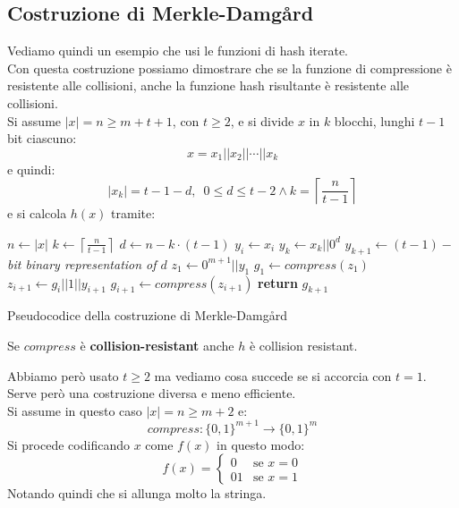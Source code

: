 \documentclass[a4paper,12pt, oneside]{book}
\begin{document}
\subsection{Costruzione di Merkle-Damg{\aa}rd}
Vediamo quindi un esempio che usi le funzioni di hash iterate. \\
Con questa costruzione possiamo dimostrare che se la funzione di compressione è
resistente alle collisioni, anche la funzione hash risultante è resistente alle
collisioni. \\
Si assume $|x|=n\geq m+t+1$, con $t\geq 2$, e si divide $x$ in $k$ blocchi,
lunghi $t-1$ bit ciascuno:
\[x=x_1||x_2||\cdots ||x_k\]
e quindi:
\[|x_k|=t-1-d,\,\,\,0\leq d\leq t-2\land
  k=\left\lceil\frac{n}{t-1}\right\rceil\]
e si calcola $h(x)$ tramite:
\begin{algorithm}[H]
  \small
  \begin{algorithmic}
    \State $n\gets |x|$
    \State $k\gets\left\lceil\frac{n}{t-1}\right\rceil$
    \State $d\gets n-k\cdot (t-1)$
    \State $y_i\gets x_i$
    \EndFor
    \State $y_k\gets x_k||0^d$
    \State $y_{k+1}\gets(t-1)-$\textit{bit binary representation of $d$}
    \State $z_1\gets 0^{m+1}||y_1$
    \State $g_1\gets compress(z_1)$
    \State $z_{i+1}\gets g_i||1||y_{i+1}$
    \State $g_{i+1}\gets compress(z_{i+1})$
    \EndFor
    \State \textbf{return} $g_{k+1}$
    \EndFunction
  \end{algorithmic}
  \caption{Pseudocodice della costruzione di Merkle-Damg{\aa}rd}
\end{algorithm}
\begin{teorema}
  Se $compress$ è \textbf{collision-resistant} anche $h$ è collision resistant.
\end{teorema}
Abbiamo però usato $t\geq 2$ ma vediamo cosa succede se si accorcia con
$t=1$. Serve però una costruzione diversa e meno efficiente.\\
Si assume in questo caso $|x|=n\geq m+2$ e:
\[compress :\{0,1\}^{m+1}\to \{0,1\}^m\]
Si procede codificando $x$ come $f(x)$ in questo modo:
\[f(x)=
  \begin{cases}
    0&\mbox{se } x=0\\
    01&\mbox{se } x=1
  \end{cases}
\]
Notando quindi che si allunga molto la stringa.\\
\end{document}
